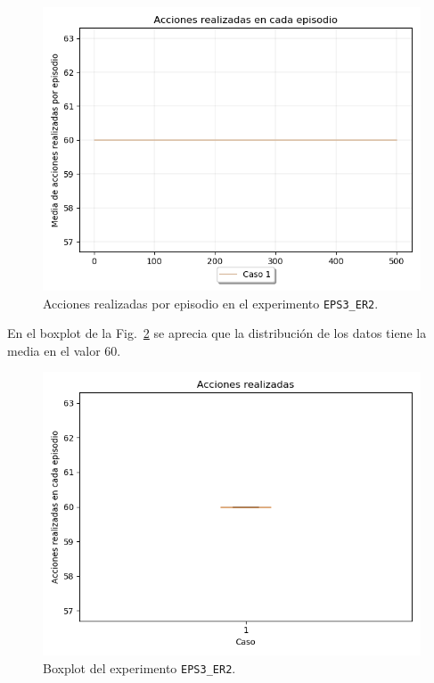 \begin{figure}
    \centering
    \includegraphics[scale=0.4]{cap5_experimentacion/images/dim5_lr0-01_ep0.1_acciones.png}
    \caption{Acciones realizadas por episodio en el experimento \texttt{EPS3\_ER2}.}
    \label{fig:dim5_lr0-01_ep0.1_acciones}
\end{figure}

En el boxplot de la Fig.~\ref{fig:dim5_lr0-01_ep0.1_boxplot} se aprecia que la distribución de los datos tiene la media en el valor 60.  \\
 
\begin{figure}
    \centering
    \includegraphics[scale=0.4]{cap5_experimentacion/images/dim5_lr0-01_ep0.1_boxplot.png}
    \caption{Boxplot del experimento \texttt{EPS3\_ER2}.}
    \label{fig:dim5_lr0-01_ep0.1_boxplot}
\end{figure}

